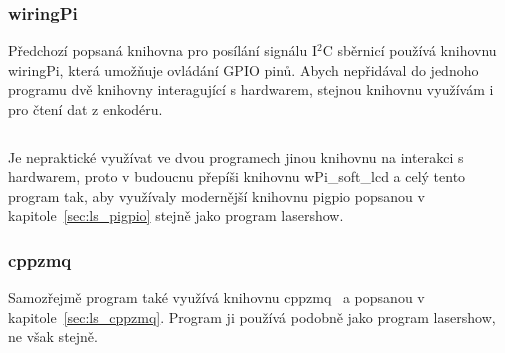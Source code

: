\subsubsection{wiringPi}
Předchozí popsaná knihovna pro posílání signálu I$^{2}$C sběrnicí používá knihovnu wiringPi, která umožňuje ovládání GPIO pinů. Abych nepřidával do jednoho programu dvě knihovny interagující s hardwarem, stejnou knihovnu využívám i pro čtení dat z enkodéru.

\inputminted[frame=lines,fontsize=\footnotesize{}, linenos, breaklines]{cpp}{code_examples/wiringpi_isr.cpp}

Je nepraktické využívat ve dvou programech jinou knihovnu na interakci s hardwarem, proto v budoucnu přepíši knihovnu wPi\_soft\_lcd a celý tento program tak, aby využívaly modernější knihovnu pigpio popsanou v kapitole~\ref{sec:ls_pigpio} stejně jako program lasershow.


\subsubsection{cppzmq}
Samozřejmě program také využívá knihovnu cppzmq~\cite{cppzmq} a popsanou v kapitole~\ref{sec:ls_cppzmq}. Program ji používá podobně jako program lasershow, ne však stejně.

